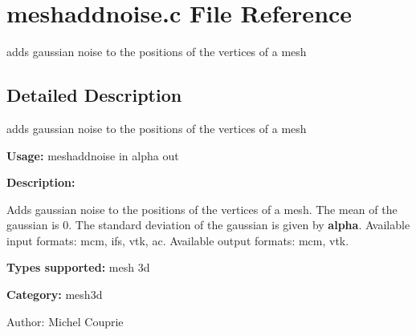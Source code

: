 \section{meshaddnoise.c File Reference}
\label{meshaddnoise_8c}
adds gaussian noise to the positions of the vertices of a mesh  




\label{_details}
\subsection{Detailed Description}
adds gaussian noise to the positions of the vertices of a mesh 

{\bf Usage:} meshaddnoise in alpha out

{\bf Description:}

Adds gaussian noise to the positions of the vertices of a mesh. The mean of the gaussian is 0. The standard deviation of the gaussian is given by {\bf alpha}. Available input formats: mcm, ifs, vtk, ac. Available output formats: mcm, vtk.

{\bf Types supported:} mesh 3d

{\bf Category:} mesh3d

\begin{Desc}
\item[Author:]Michel Couprie \end{Desc}
